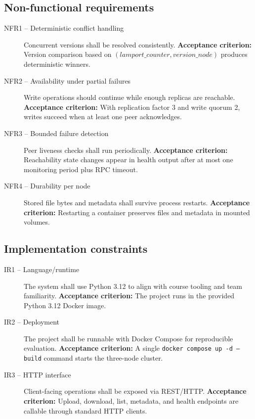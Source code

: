 \documentclass{scrartcl}
\begin{document}
\subsection*{Non-functional requirements}
\begin{description}
  \item[NFR1 -- Deterministic conflict handling] Concurrent versions shall be resolved consistently.
  \textbf{Acceptance criterion:} Version comparison based on $(lamport\_counter, version\_node)$ produces deterministic winners.

  \item[NFR2 -- Availability under partial failures] Write operations should continue while enough replicas are reachable.
  \textbf{Acceptance criterion:} With replication factor 3 and write quorum 2, writes succeed when at least one peer acknowledges.

  \item[NFR3 -- Bounded failure detection] Peer liveness checks shall run periodically.
  \textbf{Acceptance criterion:} Reachability state changes appear in health output after at most one monitoring period plus RPC timeout.

  \item[NFR4 -- Durability per node] Stored file bytes and metadata shall survive process restarts.
  \textbf{Acceptance criterion:} Restarting a container preserves files and metadata in mounted volumes.
\end{description}

\subsection*{Implementation constraints}
\begin{description}
  \item[IR1 -- Language/runtime] The system shall use Python 3.12 to align with course tooling and team familiarity.
  \textbf{Acceptance criterion:} The project runs in the provided Python 3.12 Docker image.

  \item[IR2 -- Deployment] The project shall be runnable with Docker Compose for reproducible evaluation.
  \textbf{Acceptance criterion:} A single \texttt{docker compose up -d --build} command starts the three-node cluster.

  \item[IR3 -- HTTP interface] Client-facing operations shall be exposed via REST/HTTP.
  \textbf{Acceptance criterion:} Upload, download, list, metadata, and health endpoints are callable through standard HTTP clients.
\end{description}
\end{document}
